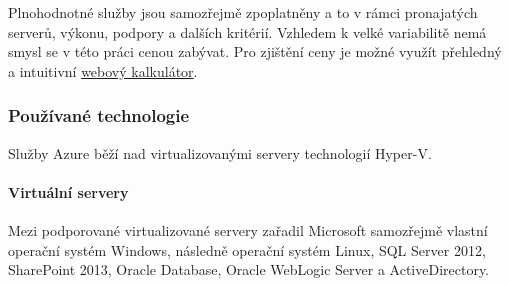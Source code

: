 Plnohodnotné služby jsou samozřejmě zpoplatněny a to v rámci pronajatých serverů, výkonu, podpory a dalších kritérií. Vzhledem k velké variabilitě nemá smysl se v této práci cenou zabývat. Pro zjištění ceny je možné využít přehledný a intuitivní \href{http://www.windowsazure.com/en-us/pricing/calculator/?scenario=full}{webový kalkulátor}.

\subsubsection{Používané technologie}
Služby Azure běží nad virtualizovanými servery technologií Hyper-V.

\paragraph{Virtuální servery}
Mezi podporované virtualizované servery zařadil Microsoft samozřejmě vlastní operační systém Windows, následně operační systém Linux, SQL Server 2012, SharePoint 2013, Oracle Database, Oracle WebLogic Server a ActiveDirectory.

